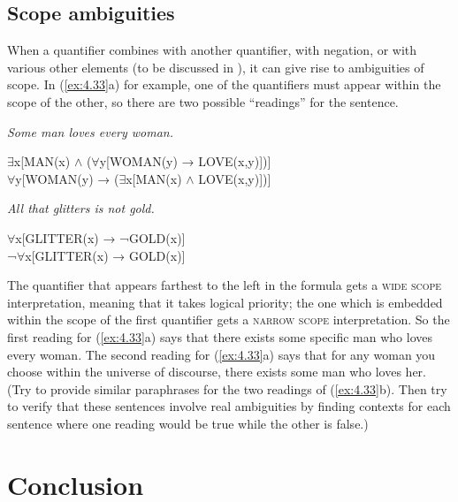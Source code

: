 \subsection{Scope ambiguities}\label{sec:4.4.2}

When a quantifier combines with another quantifier, with negation, or with various other elements (to be discussed in ), it can give rise to ambiguities of scope. In (\ref{ex:4.33}a) for example, one of the quantifiers must appear within the scope of the other, so there are two possible “readings” for the sentence.


\ea \label{ex:4.33}
\ea \textit{Some man loves every woman.}\\
  \begin{xlisti} 
      \ex ${\exists}$x[MAN(x) $\wedge$ (${\forall}$y[WOMAN(y) → LOVE(x,y)])]\\
      \ex ${\forall}$y[WOMAN(y) → (${\exists}$x[MAN(x) $\wedge$ LOVE(x,y)])]
  \end{xlisti} 
\ex  \textit{All that glitters is not gold.}\\
  \begin{xlisti}
  \ex ${\forall}$x[GLITTER(x) → ¬GOLD(x)]\\
  \ex ¬${\forall}$x[GLITTER(x) → GOLD(x)]
  \end{xlisti}
\z \z


The quantifier that appears farthest to the left in the formula gets a \textsc{wide scope} interpretation, meaning that it takes logical priority; the one which is embedded within the scope of the first quantifier gets a \textsc{narrow scope} interpretation. So the first reading for (\ref{ex:4.33}a) says that there exists some specific man who loves every woman. The second reading for (\ref{ex:4.33}a) says that for any woman you choose within the universe of discourse, there exists some man who loves her. (Try to provide similar paraphrases for the two readings of (\ref{ex:4.33}b). Then try to verify that these sentences involve real ambiguities by finding contexts for each sentence where one reading would be true while the other is false.)


\section{Conclusion}\label{sec:4.5}

